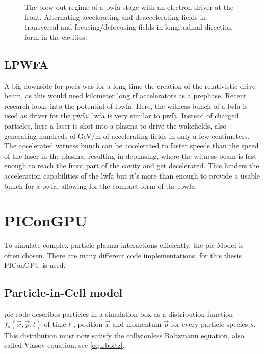 \documentclass[bachelor_thesis]{subfiles}
\begin{document}
\begin{figure}
	\centering
	\missingfigure{}
	\caption{The blow-out regime of a \gls{pwfa} stage with an electron driver at the front. Alternating accelerating and deaccelerating fields in transversal and focusing/defocusing fields in longitudinal direction form in the cavities.}
	\label{fig:pwfa}
\end{figure} 

\subsection{LPWFA} \label{chap:lpfwa}
A big downside for \gls{pwfa} was for a long time the creation of the relativistic drive beam, as this would need kilometer long \gls{rf} accelerators as a prephase. Recent research \cite{Kurz2021} looks into the potential of \gls{lpwfa}.
Here, the witness bunch of a \gls{lwfa} is used as driver for the \gls{pwfa}. \Gls{lwfa} is very similar to \gls{pwfa}. Instead of charged particles, here a laser is shot into a plasma to drive the wakefields, also generating hundreds of \unit{\GeV/\m} of accelerating fields in only a few centimeters.
The accelerated witness bunch can be accelerated to faster speeds than the speed of the laser in the plasma, resulting in dephasing, where the witness beam is fast enough to reach the front part of the cavity and get decelerated. This hinders the acceleration capabilities of the \gls{lwfa} but it's
more than enough to provide a usable bunch for a \gls{pwfa}, allowing for the compact form of the \gls{lpwfa}.

\section{PIConGPU}
To simulate complex particle-plasma interactions efficiently, the \gls{pic}-Model is often chosen. There are many different code implementations, for this thesis PIConGPU \cite{PIConGPU2013, PICRepo} is used.

\subsection{Particle-in-Cell model} \label{chap:pic}
\Gls{pic}-code describes particles in a simulation box as a distribution function $f_s(\vec{x}, \vec{p}, t)$ of time $t$ , position $\vec{x}$ and momentum $\vec{p}$ for every particle species $s$.
This distribution must now satisfy the collisionless Boltzmann equation, also called Vlasov equation\cite{Vlasov1968}, see \autoref{equ:boltz}.
\end{document}
